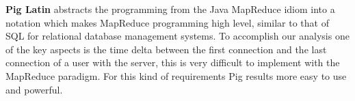 \textbf{Pig Latin} abstracts the programming from the Java MapReduce idiom into a notation which makes MapReduce programming high level, similar to that of SQL for relational database management systems. To accomplish our analysis one of the key aspects is the time delta between the first connection and the last connection of a user with the server, this is very difficult to implement with the MapReduce paradigm. 
For this kind of requirements Pig results more easy to use and powerful. 
